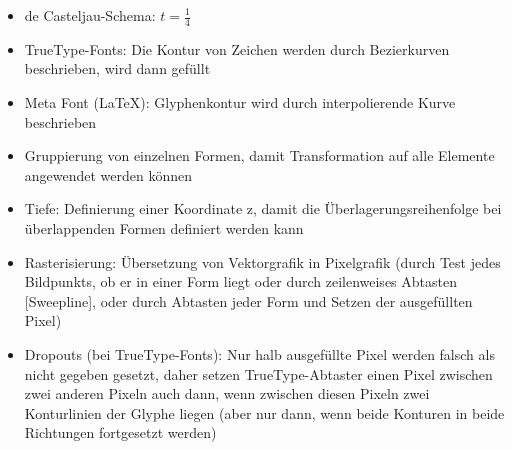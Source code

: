 \documentclass[12pt,landscape]{article}
\begin{document}
\begin{multicols}{3}
\begin{itemize}
\item de Casteljau-Schema: $t = \frac{1}{4}$
\item TrueType-Fonts: Die Kontur von Zeichen werden durch Bezierkurven beschrieben, wird dann gefüllt
\item Meta Font (\LaTeX): Glyphenkontur wird durch interpolierende Kurve beschrieben
\item Gruppierung von einzelnen Formen, damit Transformation auf alle Elemente angewendet werden können
\item Tiefe: Definierung einer Koordinate z, damit die Überlagerungsreihenfolge bei überlappenden Formen definiert werden kann
\item Rasterisierung: Übersetzung von Vektorgrafik in Pixelgrafik (durch Test jedes Bildpunkts, ob er in einer Form liegt oder durch zeilenweises Abtasten [Sweepline], oder durch Abtasten jeder Form und Setzen der ausgefüllten Pixel)
\item Dropouts (bei TrueType-Fonts): Nur halb ausgefüllte Pixel werden falsch als nicht gegeben gesetzt, daher setzen TrueType-Abtaster einen Pixel zwischen zwei anderen Pixeln auch dann, wenn zwischen diesen Pixeln zwei Konturlinien der Glyphe liegen (aber nur dann, wenn beide Konturen in beide Richtungen fortgesetzt werden)
\end{itemize}

\end{multicols}
\end{document}
